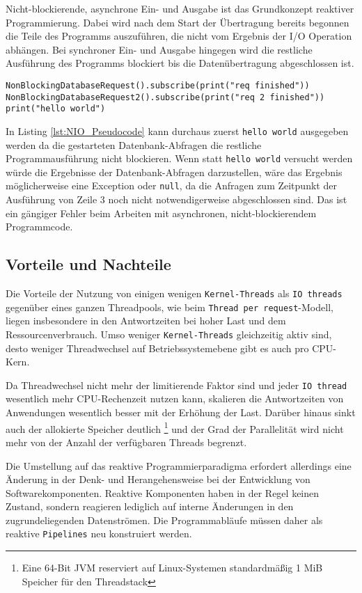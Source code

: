 Nicht-blockierende, asynchrone Ein- und Ausgabe ist das Grundkonzept reaktiver Programmierung.
Dabei wird nach dem Start der Übertragung bereits begonnen die Teile des Programms auszuführen, die nicht vom Ergebnis der I/O Operation abhängen.
Bei synchroner Ein- und Ausgabe hingegen wird die restliche Ausführung des Programms blockiert
bis die Datenübertragung abgeschlossen ist.
\newpage
\begin{lstlisting}[caption=Pseudocode Non-blocking I/O (NIO), captionpos=b, label=lst:NIO_Pseudocode]
NonBlockingDatabaseRequest().subscribe(print("req finished"))
NonBlockingDatabaseRequest2().subscribe(print("req 2 finished"))
print("hello world")
\end{lstlisting}
In Listing \ref{lst:NIO_Pseudocode} kann durchaus zuerst \verb|hello world| ausgegeben werden da die gestarteten Datenbank-Abfragen die
restliche Programmausführung nicht blockieren. Wenn statt \verb|hello world| versucht werden würde die Ergebnisse der Datenbank-Abfragen
darzustellen, wäre das Ergebnis möglicherweise eine Exception oder \verb|null|, da die Anfragen zum Zeitpunkt der Ausführung von Zeile 3 noch nicht
notwendigerweise abgeschlossen sind. Das ist ein gängiger Fehler beim Arbeiten mit asynchronen, nicht-blockierendem Programmcode.

\subsection{Vorteile und Nachteile}
\label{subsec:vorteile_nachteile}
Die Vorteile der Nutzung von einigen wenigen \verb|Kernel-Threads| als \verb|IO threads| gegenüber eines ganzen Threadpools,
wie beim \verb|Thread per request|-Modell, liegen insbesondere in den Antwortzeiten bei
hoher Last und dem Ressourcenverbrauch.
Umso weniger \verb|Kernel-Threads| gleichzeitig aktiv sind, desto weniger Threadwechsel auf Betriebssystemebene
gibt es auch pro CPU-Kern.

Da Threadwechsel nicht mehr der limitierende Faktor sind und jeder \verb|IO thread| wesentlich mehr CPU-Rechenzeit nutzen kann,
skalieren die Antwortzeiten von Anwendungen wesentlich besser mit der Erhöhung der Last.
Darüber hinaus sinkt auch der allokierte Speicher deutlich
\footnote{Eine 64-Bit JVM reserviert auf Linux-Systemen standardmäßig 1 MiB Speicher für den Threadstack\parencite{OpenJDKGitHub}}
und der Grad der Parallelität wird nicht mehr von der Anzahl der verfügbaren Threads begrenzt.

Die Umstellung auf das reaktive Programmierparadigma erfordert allerdings eine Änderung in der Denk- und Herangehensweise bei der
Entwicklung von Softwarekomponenten. Reaktive Komponenten haben in der Regel keinen Zustand,
sondern reagieren lediglich auf interne Änderungen in den zugrundeliegenden Datenströmen.
Die Programmabläufe müssen daher als reaktive \verb|Pipelines| neu konstruiert werden.

